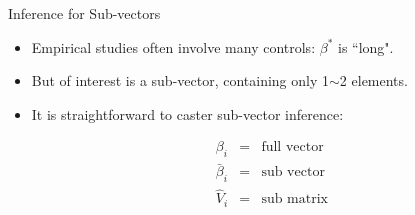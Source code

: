 \documentclass[beamer, t]{beamer}
\begin{document}
\begin{frame}{Inference for Sub-vectors}
	
	
	\begin{itemize}
		\item Empirical studies often involve many controls: $\beta^*$ is ``long".
		
		\item But of interest is a sub-vector, containing only 1$\sim$2 elements. 
		
		\item It is straightforward to caster sub-vector inference:
		
		\begin{eqnarray}
			\beta_i&=&  \text{full vector}\\
			\bar\beta_i&=&  \text{sub vector}\\
			\widehat V_i&=&  \text{sub matrix}
		\end{eqnarray}
		
		
	\end{itemize}
	
\end{frame}
\end{document}
